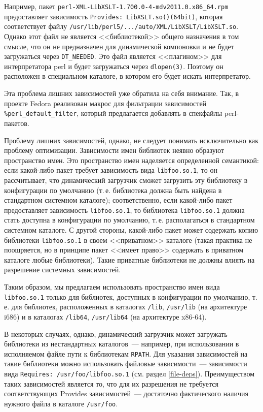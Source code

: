 \documentclass[russian,a4paper,12pt,titlepage]{article}
\begin{document}
Например, пакет \verb|perl-XML-LibXSLT-1.700.0-4-mdv2011.0.x86_64.rpm| предоставляет зависимость \verb|Provides: LibXSLT.so()(64bit)|,
которая соответствует файлу \texttt{/usr/lib/perl5/.../auto/XML/LibXSLT/LibXSLT.so}.  Однако этот файл не является <<библиотекой>>
общего назначения в том смысле, что он не предназначен для динамической компоновки и не будет загружаться через \verb|DT_NEEDED|.
Это файл является <<плагином>> для интерпретатора perl и будет загружаться через \verb|dlopen(3)|.  Поэтому он расположен
в специальном каталоге, в котором его будет искать интерпретатор.

Эта проблема лишних зависимостей уже обратила на себя внимание.  Так, в проекте Fedora реализован макрос для
фильтрации зависимостей \verb|%perl_default_filter|, который предлагается добавлять в спекфайлы perl-пакетов.

Проблему лишних зависимостей, однако, не следует понимать исключительно как проблему оптимизации.
Зависимости имен библиотек неявно образуют пространство имен.  Это пространство имен наделяется
определенной семантикой: если какой-либо пакет требует зависимость вида \verb|libfoo.so.1|,
то он рассчитывает, что динамический загрузчик сможет загрузить эту библиотеку в конфигурации
по умолчанию (т.\,е. библиотека должна быть найдена в стандартном системном каталоге);
соответственно, если какой-либо пакет предоставляет зависимость \verb|libfoo.so.1|,
то библиотека \verb|libfoo.so.1| должна стать доступна в конфигурации по умолчанию, т.\,е.
располагаться в стандартном системном каталоге.  С другой стороны, какой-либо пакет может
содержать копию библиотеки \verb|libfoo.so.1| в своем <<приватном>> каталоге (такая практика
не поощряется, но в принципе пакет <<имеет право>> содержать в приватном каталоге любые библиотеки).
Такие приватные библиотеки не должны влиять на разрешение системных зависимостей.

Таким образом, мы предлагаем использовать пространство имен вида \verb|libfoo.so.1| только для
библиотек, доступных в конфигурации по умолчанию, т.\,е. для библиотек, расположенных в каталогах
\verb|/lib|, \verb|/usr/lib| (на архитектуре i686) и в каталогах \verb|/lib64|, \verb|/usr/lib64|
(на архитектуре x86-64).

В некоторых случаях, однако, динамический загрузчик может загружать библиотеки из нестандартных
каталогов~--- например, при использовании в исполняемом файле пути к библиотекам \verb|RPATH|.
Для указания зависимостей на такие библиотеки можно использовать файловые зависимости~---
зависимости вида \texttt{Requires: /usr/foo/libfoo.so.1} (см. раздел \ref{file-deps}).
Преимуществом таких зависимостей является то, что для их разрешения не требуется соответствующих
Provides зависимостей~--- достаточно фактического наличия нужного файла в каталоге \verb|/usr/foo|.
\end{document}
